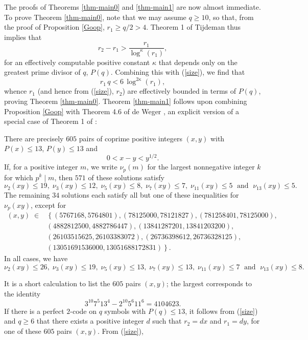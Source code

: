 \documentclass{amsart}
\begin{document}
The proofs of Theorems \ref{thm-main0} and \ref{thm-main1} are now almost immediate. To prove Theorem  \ref{thm-main0}, note that we may assume $q \geq 10$, so that, from the proof of Proposition \ref{Goop}, $r_1 \geq q/2 > 4$. Theorem 1 of Tijdeman \cite{Tij} thus implies that
$$
r_2-r_1 > \frac{r_1}{\log^\kappa (r_1)},
$$
for an effectively computable positive constant $\kappa$ that depends only on the greatest prime divisor of $q$, $P(q)$. Combining this with (\ref{size}), we find that
$$
r_1 \, q < 6 \, \log^{2\kappa} (r_1),
$$
whence $r_1$ (and hence from (\ref{size}), $r_2$) are effectively bounded in terms of $P(q)$, proving Theorem  \ref{thm-main0}. Theorem \ref{thm-main1} follows upon combining Proposition \ref{Goop} with Theorem 4.6 of de Weger \cite{dW}, an explicit version of a special case of Theorem 1 of \cite{Tij} :
\begin{thm}[de Weger] \label{thm-dW}
There are precisely $605$ pairs of coprime positive integers $(x,y)$ with $P(x) \leq 13$, $P(y) \leq 13$ and
$$
0 < x-y < y^{1/2}.
$$
If, for a positive integer $m$, we write $\nu_p (m)$ for the largest nonnegative integer $k$ for which $p^k \mid m$, then $571$ of these solutions satisfy
$$
\nu_2(xy) \leq 19, \; \nu_3(xy) \leq 12, \; \nu_5(xy) \leq 8, \; \nu_7(xy) \leq 7, \; \nu_{11}(xy) \leq 5 \; \mbox{ and } \; \nu_{13}(xy) \leq 5. 
$$
The remaining $34$ solutions each satisfy all but one of these inequalities for $\nu_p(xy)$, except for
$$
\begin{array}{ll}
(x,y) \; \in & \left\{ (5767168,5764801), (78125000,78121827),  
(781258401,78125000), \right. \\
& \left.  (4882812500,4882786447), 
(13841287201,13841203200),  \right. \\
& \left. (26103515625,26103383072), (26736398612,26736328125), \right. \\
& \left. (13051691536000,13051688172831) \right\}.
\end{array}
$$
In all cases, we have
$$
\nu_2(xy) \leq 26, \; \nu_3(xy) \leq 19, \; \nu_5(xy) \leq 13, \; \nu_7(xy) \leq 13, \; \nu_{11}(xy) \leq 7 \; \mbox{ and } \; \nu_{13}(xy) \leq 8. 
$$
\end{thm}
It is a short calculation to list the $605$ pairs $(x,y)$; the largest corresponds to the identity
\begin{equation} \label{EX}
3^{10} 7^5 13^4 - 2^{10} 5^6 11^6 = 4104623.
\end{equation}
If there is a perfect $2$-code on $q$ symbols with $P(q) \leq 13$, it follows from (\ref{size}) and $q \geq 6$ that there exists a positive integer $d$ such that $r_2=dx$ and $r_1=dy$, for one of these $605$ pairs $(x,y)$. From (\ref{size}), 
\end{document}

